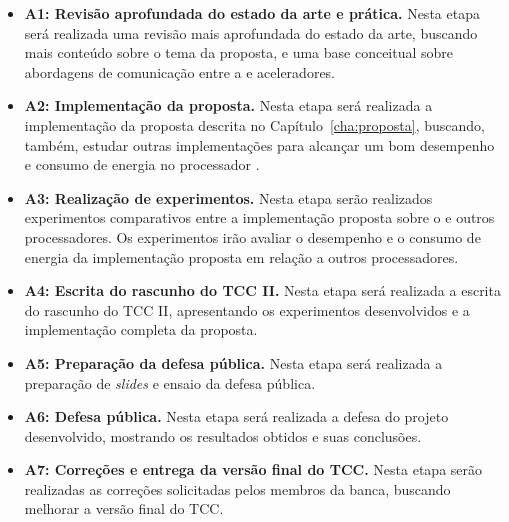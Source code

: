 \begin{itemize}
    \item \textbf{A1: Revisão aprofundada do estado da arte e prática.} Nesta etapa será
        realizada uma revisão mais aprofundada do estado da arte, buscando mais
        conteúdo sobre o tema da proposta, e uma base conceitual sobre abordagens de
        comunicação entre a \cpu e aceleradores.
    \item \textbf{A2: Implementação da proposta.} Nesta etapa será realizada a
        implementação da proposta descrita no Capítulo~\ref{cha:proposta},
        buscando, também, estudar outras implementações para alcançar um bom
        desempenho e consumo de energia no processador \mppa.
    \item \textbf{A3: Realização de experimentos.} Nesta etapa serão realizados
        experimentos comparativos entre a implementação proposta sobre o \mppa e
        outros processadores. Os experimentos irão avaliar o desempenho e o consumo de
        energia da implementação proposta em relação a outros processadores.
    \item \textbf{A4: Escrita do rascunho do TCC II.} Nesta etapa será realizada
        a escrita do rascunho do TCC II, apresentando os experimentos desenvolvidos e a
        implementação completa da proposta.
    \item \textbf{A5: Preparação da defesa pública.} Nesta etapa será realizada
        a preparação de \textit{slides} e ensaio da defesa pública.
    \item \textbf{A6: Defesa pública.} Nesta etapa será realizada a defesa do
        projeto desenvolvido, mostrando os resultados obtidos e suas conclusões.
    \item \textbf{A7: Correções e entrega da versão final do TCC.} Nesta etapa
        serão realizadas as correções solicitadas pelos membros da banca, buscando
        melhorar a versão final do TCC.
\end{itemize}


